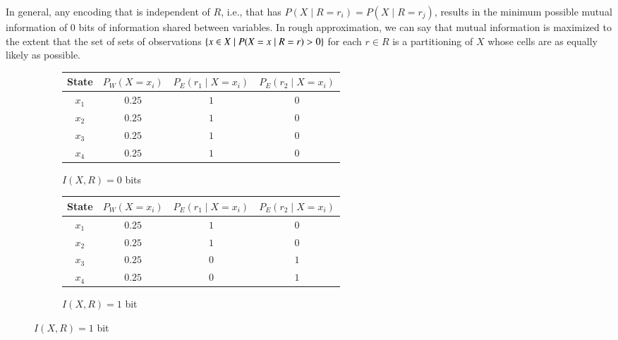 \documentclass[nobib,nofonts]{tufte-handout}
\begin{document}
In general, any encoding that is independent of $R$, i.e., that has $P(X \mid R=r_{i}) = P(X \mid R=r_{j})$, results in the minimum possible mutual information of 0 bits of information shared between variables.
In rough approximation, we can say that mutual information is maximized to the extent that the set of sets of observations $\left\{x \in X \mid P(X=x \mid R=r) > 0\right\}$ for each $r \in R$ is a partitioning of $X$ whose cells are as equally likely as possible.

\begin{figure}[tp]
\renewcommand{\arraystretch}{1.05}
\setlength{\tabcolsep}{6pt}

\footnotesize

\begin{subfigure}[t]{0.48\linewidth}
\centering
\begin{tabular}{cccc}
\toprule
State & $P_{W}(X=x_{i})$ & $P_{E}(r_1\mid X=x_{i})$ & $P_{E}(r_2\mid X=x_{i})$ \\
\midrule
$x_1$ & $0.25$ & $1$ & $0$ \\
$x_2$ & $0.25$ & $1$ & $0$ \\
$x_3$ & $0.25$ & $1$ & $0$ \\
$x_4$ & $0.25$ & $1$ & $0$ \\
\bottomrule
\end{tabular}
\caption{$I(X,R) = 0$ bits}
\end{subfigure}
\hfill
\begin{subfigure}[t]{0.48\linewidth}
\centering
\begin{tabular}{cccc}
\toprule
State & $P_{W}(X=x_{i})$ & $P_{E}(r_1\mid X=x_{i})$ & $P_{E}(r_2\mid X=x_{i})$ \\
\midrule
$x_1$ & $0.25$ & $1$ & $0$ \\
$x_2$ & $0.25$ & $1$ & $0$ \\
$x_3$ & $0.25$ & $0$ & $1$ \\
$x_4$ & $0.25$ & $0$ & $1$ \\
\bottomrule
\end{tabular}
\caption{$I(X,R) = 1$ bit}
\end{subfigure}

\bigskip


\end{figure}
\end{document}
